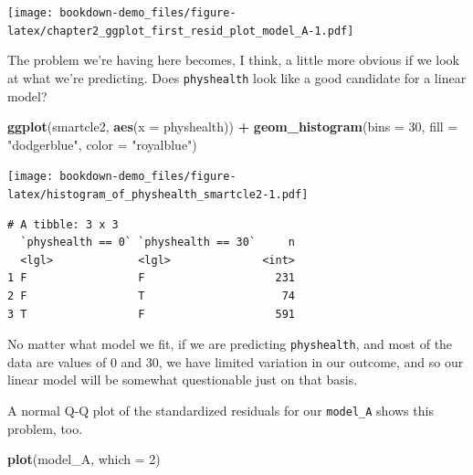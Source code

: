 \documentclass[]{book}
\newenvironment{Shaded}{\begin{snugshade}}{\end{snugshade}}
\newcommand{\KeywordTok}[1]{\textcolor[rgb]{0.13,0.29,0.53}{\textbf{#1}}}
\newcommand{\DataTypeTok}[1]{\textcolor[rgb]{0.13,0.29,0.53}{#1}}
\newcommand{\DecValTok}[1]{\textcolor[rgb]{0.00,0.00,0.81}{#1}}
\newcommand{\StringTok}[1]{\textcolor[rgb]{0.31,0.60,0.02}{#1}}
\newcommand{\OperatorTok}[1]{\textcolor[rgb]{0.81,0.36,0.00}{\textbf{#1}}}
\newcommand{\NormalTok}[1]{#1}
\theoremstyle{definition}
\theoremstyle{definition}
\theoremstyle{definition}
\theoremstyle{remark}
\begin{document}
\texttt{[image: bookdown-demo\_files/figure-latex/chapter2\_ggplot\_first\_resid\_plot\_model\_A-1.pdf]}

The problem we're having here becomes, I think, a little more obvious if
we look at what we're predicting. Does \texttt{physhealth} look like a
good candidate for a linear model?

\begin{Shaded}
\begin{Highlighting}[]
\KeywordTok{ggplot}\NormalTok{(smartcle2, }\KeywordTok{aes}\NormalTok{(}\DataTypeTok{x =}\NormalTok{ physhealth)) }\OperatorTok{+}
\KeywordTok{geom_histogram}\NormalTok{(}\DataTypeTok{bins =} \DecValTok{30}\NormalTok{, }\DataTypeTok{fill =} \StringTok{"dodgerblue"}\NormalTok{, }\DataTypeTok{color =} \StringTok{"royalblue"}\NormalTok{)}
\end{Highlighting}
\end{Shaded}

\texttt{[image: bookdown-demo\_files/figure-latex/histogram\_of\_physhealth\_smartcle2-1.pdf]}

\begin{Shaded}
\end{Shaded}

\begin{verbatim}
# A tibble: 3 x 3
  `physhealth == 0` `physhealth == 30`     n
  <lgl>             <lgl>              <int>
1 F                 F                    231
2 F                 T                     74
3 T                 F                    591
\end{verbatim}

No matter what model we fit, if we are predicting \texttt{physhealth},
and most of the data are values of 0 and 30, we have limited variation
in our outcome, and so our linear model will be somewhat questionable
just on that basis.

A normal Q-Q plot of the standardized residuals for our
\texttt{model\_A} shows this problem, too.

\begin{Shaded}
\begin{Highlighting}[]
\KeywordTok{plot}\NormalTok{(model_A, }\DataTypeTok{which =} \DecValTok{2}\NormalTok{)}
\end{Highlighting}
\end{Shaded}
\end{document}
